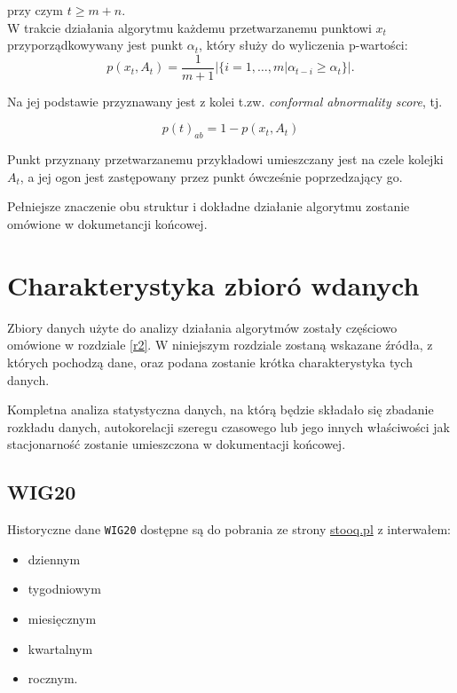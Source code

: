 \documentclass{article}
\begin{document}
przy czym $t \geq m+n$. \\
W trakcie działania algorytmu każdemu przetwarzanemu punktowi $x_{t}$ przyporządkowywany jest punkt $\alpha_{t}$, który służy do wyliczenia
p-wartości:
\begin{equation*}
  p(x_{t}, A_{t}) = \frac{1}{m + 1}|\{i = 1, \dots, m | \alpha_{t-i} \geq \alpha_{t}\}|.
\end{equation*}

Na jej podstawie przyznawany jest z kolei t.zw. \emph{conformal abnormality score}, tj. 

\begin{equation*}
  p(t)_{ab} = 1 - p(x_{t}, A_{t}) 
\end{equation*}

Punkt przyznany przetwarzanemu przykładowi umieszczany jest na czele kolejki $A_{t}$, a jej ogon jest zastępowany przez punkt ówcześnie poprzedzający go. 

Pełniejsze znaczenie obu struktur i dokładne działanie algorytmu zostanie omówione w dokumetancji końcowej.


\section{Charakterystyka zbioró wdanych \label{r5}}

Zbiory danych użyte do analizy działania algorytmów zostały częściowo
omówione w rozdziale \ref{r2}. W niniejszym rozdziale zostaną wskazane
źródła, z których pochodzą dane, oraz podana zostanie krótka
charakterystyka tych danych.

Kompletna analiza statystyczna danych, na którą będzie składało się
zbadanie rozkładu danych, autokorelacji szeregu czasowego lub jego
innych właściwości jak stacjonarność zostanie umieszczona w dokumentacji
końcowej.

\subsection{WIG20}

Historyczne dane \texttt{WIG20} dostępne są do pobrania ze strony
\href{https://stooq.pl/q/d/?s=wig20}{stooq.pl} z interwałem:

\begin{itemize}
\item
  dziennym
\item
  tygodniowym
\item
  miesięcznym
\item
  kwartalnym
\item
  rocznym.
\end{itemize}
\end{document}
